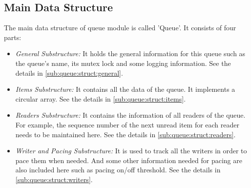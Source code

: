  
\subsection{\label{sub:queue:struct}{Main Data Structure}}
The main data structure of queue module is called 'Queue'. It consists of four parts:
\begin{itemize}
	 \item{\emph{ General Substructure:} It holds the general information for this queue such as the queue's name, its mutex lock and some logging information. See the details in \ref{sub:queue:struct:general}.}
	\item{\emph{ Items Substructure:} It contains all the data of the queue. It implements a circular array. See the details in \ref{sub:queue:struct:items}.}
	\item{\emph{ Readers Substructure:} It contains the information of all readers of the queue. For example, the sequence number of the next unread item for each reader needs to be maintained here. See the details in \ref{sub:queue:struct:readers}.}
	 \item{\emph{ Writer and Pacing Substructure:} It is used to track all the writers in order to pace them when needed. And some other information needed for pacing are also included here such as pacing on/off threshold.  See the details in \ref{sub:queue:struct:writers}.}
\end{itemize}  

